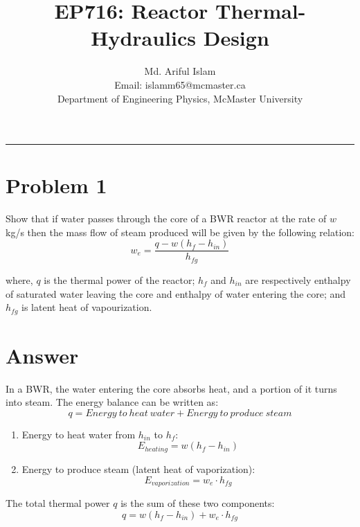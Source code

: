 \documentclass[12pt]{article}
\title{EP716: Reactor Thermal-Hydraulics Design}
\author{Md. Ariful Islam \\ Email: islamm65@mcmaster.ca \\ Department of Engineering Physics, McMaster University}
\date{}
\begin{document}
\maketitle

\rule{\textwidth}{0.4pt}

\section*{Problem 1}

Show that if water passes through the core of a BWR reactor at the rate of $w$ kg/s then the 
mass flow of steam produced will be given by the following relation: 
\begin{equation*}\label{eq:1}
w_{e}={\frac{q-w(h_{f}-h_{i n})}{h_{f g}}}
\end{equation*}

where, $q$ is the thermal power of the reactor; $h_f$ and $h_{in}$ are respectively enthalpy of saturated water leaving the core and enthalpy of water entering the core; and $h_{fg}$ is latent heat of vapourization.

\section*{Answer}

In a BWR, the water entering the core absorbs heat, and a portion of it turns into steam. The energy balance can be written as:
\begin{equation}\label{eq:2}
    q = Energy\ to\ heat\ water + Energy\ to\ produce\ steam
\end{equation}

\begin{enumerate}
    \item Energy to heat water from $h_{in}$ to $h_f$:
    \begin{equation}\label{eq:3}
        E_{heating} = w(h_f - h_{in})
    \end{equation}
    \item Energy to produce steam (latent heat of vaporization):
    \begin{equation}
        E_{vaporization} = w_e \cdot h_{fg}
    \end{equation}
\end{enumerate}

The total thermal power $q$ is the sum of these two components:
\begin{equation}
    q = w(h_f - h_{in}) + w_e \cdot h_{fg}
\end{equation}
\end{document}
